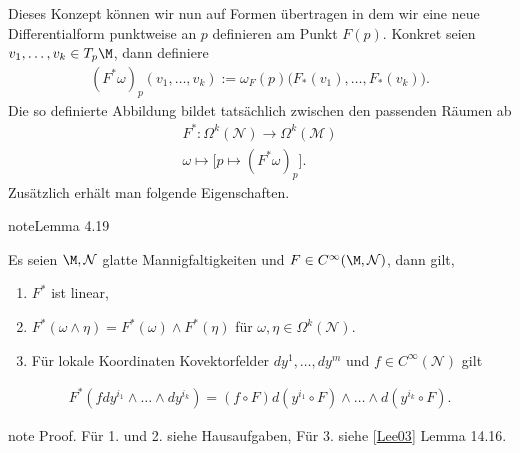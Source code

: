 \documentclass[letterpaper,10pt,german]{jupyterBook}
\begin{document}
\sphinxAtStartPar
Dieses Konzept können wir nun auf Formen übertragen in dem wir eine neue Differentialform punktweise an \(p\) definieren am Punkt \(F(p)\). Konkret seien \(v_1,\ldots, v_k\in T_p\M\), dann definiere
\begin{equation*}
\begin{split}(F^\ast\omega)_p (v_1,\ldots,v_k) := \omega_F(p)\big(F_\ast(v_1),\ldots,F_\ast(v_k)\big).\end{split}
\end{equation*}
\sphinxAtStartPar
Die so definierte Abbildung bildet tatsächlich zwischen den passenden Räumen ab
\begin{equation*}
\begin{split}F^\ast:\Omega^k(\mathcal{N})\to\Omega^k(\mathcal{M})\\
\omega\mapsto \big[ p\mapsto (F^\ast\omega)_p \big].\end{split}
\end{equation*}
\sphinxAtStartPar
Zusätzlich erhält man folgende Eigenschaften.
\label{manifolds/diffformen:lem:pullbackprop}
\begin{sphinxadmonition}{note}{Lemma 4.19}



\sphinxAtStartPar
Es seien \(\M,\mathcal{N}\) glatte Mannigfaltigkeiten und \(F\in C^\infty(\M,\mathcal{N})\), dann gilt,
\begin{enumerate}
%
\item {} 
\sphinxAtStartPar
\(F^\ast\) ist linear,

\item {} 
\sphinxAtStartPar
\(F^\ast(\omega\wedge\eta) = F^\ast(\omega) \wedge F^\ast(\eta)\) für \(\omega,\eta\in\Omega^k(\mathcal{N})\).

\item {} 
\sphinxAtStartPar
Für lokale Koordinaten Kovektorfelder \(dy^1,\ldots,dy^m\) und \(f\in C^\infty(\mathcal{N})\) gilt

\end{enumerate}
\begin{equation*}
\begin{split}F^\ast(f dy^{i_1}\wedge\ldots\wedge dy^{i_k}) = (f \circ F) d(y^{i_1}\circ F)\wedge\ldots\wedge d(y^{i_k}\circ F).\end{split}
\end{equation*}\end{sphinxadmonition}

\begin{sphinxadmonition}{note}
\sphinxAtStartPar
Proof. Für 1. und 2. siehe Hausaufgaben, Für 3. siehe {[}\hyperlink{cite.references:id18}{Lee03}{]} Lemma 14.16.
\end{sphinxadmonition}
\end{document}
